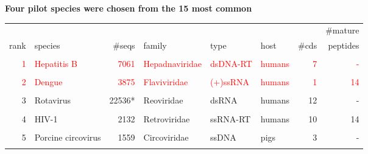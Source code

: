 \documentclass[landscape]{slides}
\begin{document}
% 
\begin{slide}
\begin{center}

\textbf{Four pilot species were chosen from the 15 most common}

\tiny
\begin{tabular}{r|l|r|l|l|l|r|r}
       &                    &              &                &          &        &       & \#mature \\ 
  rank & species            &       \#seqs & family         & type     & host   & \#cds & peptides \\ \hline
       &                    &              &                &          &        &       &          \\ 
\textcolor{red}{1} & \textcolor{red}{Hepatitis B}        &         \textcolor{red}{7061} & \textcolor{red}{Hepadnaviridae} & \textcolor{red}{dsDNA-RT} & \textcolor{red}{humans} &     \textcolor{red}{7} &       \textcolor{red}{-}  \\
       &                    &              &                &          &        &       &          \\ 
\textcolor{red}{2} & \textcolor{red}{Dengue}             &         \textcolor{red}{3875} & \textcolor{red}{Flaviviridae}   & \textcolor{red}{(+)ssRNA} & \textcolor{red}{humans} &     \textcolor{red}{1} &      \textcolor{red}{14}  \\
       &                    &              &                &          &        &       &          \\ 
     3 & Rotavirus          &      22536*  & Reoviridae     & dsRNA    & humans &    12 &       -  \\
       &                    &              &                &          &        &       &          \\ 
     4 & HIV-1              &        2132  & Retroviridae   & ssRNA-RT & humans &    10 &      14  \\
       &                    &              &                &          &        &       &          \\ 
     5 & Porcine circovirus &        1559  & Circoviridae   & ssDNA    & pigs   &     3 &       -  \\
       &                    &              &                &          &        &       &          \\ 

\end{tabular}
\end{center}
\end{slide}
\end{document}
